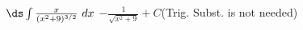 {$\ds \int \frac {x}{(x^2+9)^{3/2}}\ dx$
}
{$-\frac1{\sqrt{x^2+9}}+C$\quad (Trig. Subst. is not needed)
}